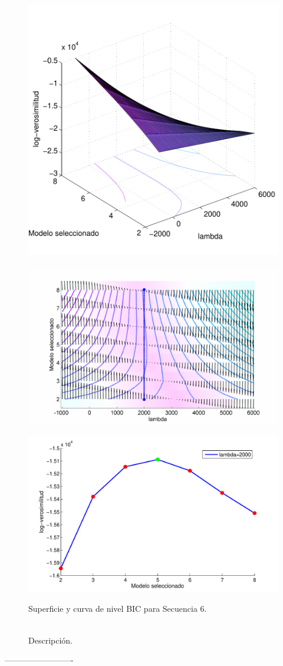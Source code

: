 \begin{figure}[H]
  \centerline  
  {\includegraphics[width=0.55\linewidth]{gfx/chap6/catsbic1} ~
   \includegraphics[width=0.5\linewidth]{gfx/chap6/catsbic2} }
  \centerline  
  {\includegraphics[width=0.4\linewidth]{gfx/chap6/catsbic3}
  } \quad
  \caption{Superficie y curva de nivel BIC para Secuencia 6.}
  \caption*{\\Descripción.}
  \label{fig:prb1_sup}
\end{figure}

-------------------------

